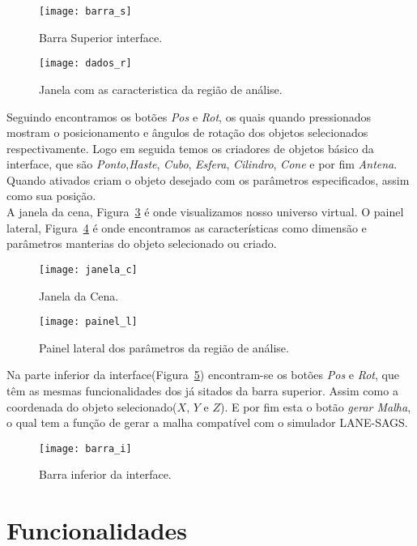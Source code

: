 \begin{figure}[ht!]
	\centering
	\texttt{[image: barra\_s]}
	\caption{Barra Superior interface.}
	\label{fg:barra_s}
\end{figure}
\begin{figure}[ht!]
	\centering
	\texttt{[image: dados\_r]}
	\caption{Janela com as caracteristica da região de análise.}
	\label{fg:dados_r}
\end{figure}

Seguindo encontramos os botões \textit{Pos} e \textit{Rot}, os quais quando pressionados mostram o posicionamento e ângulos de rotação dos objetos selecionados respectivamente. Logo em seguida temos os criadores de objetos básico da interface, que são \textit{Ponto},\textit{Haste}, \textit{Cubo}, \textit{Esfera}, \textit{Cilindro}, \textit{Cone} e por fim \textit{Antena}. Quando ativados criam o objeto desejado com os parâmetros especificados, assim como sua posição.\\

A janela da cena, Figura~\ref{fg:janela_c} é onde visualizamos nosso universo virtual. O painel lateral, Figura~\ref{fg:painel_l} é onde encontramos as características como dimensão e parâmetros manterias do objeto selecionado ou criado.\\

\begin{figure}[ht!]
	\centering
	\texttt{[image: janela\_c]}
	\caption{Janela da Cena.}
	\label{fg:janela_c}
\end{figure}
\begin{figure}[ht!]
	\centering
	\texttt{[image: painel\_l]}
	\caption{Painel lateral dos parâmetros da região de análise.}
	\label{fg:painel_l}
\end{figure}

Na parte inferior da interface(Figura~\ref{fg:barra_i}) encontram-se os botões \textit{Pos} e \textit{Rot}, que têm as mesmas funcionalidades dos já sitados da barra superior. Assim como a coordenada do objeto selecionado($X$, $Y$ e $Z$). E por fim esta o botão \textit{gerar Malha}, o qual tem a função de gerar a malha compatível com o simulador LANE-SAGS.

\begin{figure}[ht!]
	\centering
	\texttt{[image: barra\_i]}
	\caption{Barra inferior da interface.}
	\label{fg:barra_i}
\end{figure}

\section{Funcionalidades}

